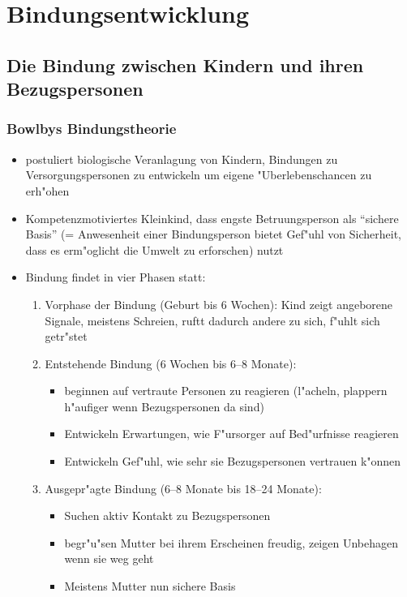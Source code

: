 \section{Bindungsentwicklung}
\subsection{Die Bindung zwischen Kindern und ihren Bezugspersonen}
\subsubsection{Bowlbys Bindungstheorie}
\begin{itemize}
	\item
		postuliert biologische Veranlagung von Kindern, Bindungen zu Versorgungspersonen zu entwickeln um eigene "Uberlebenschancen zu erh"ohen
	\item
		Kompetenzmotiviertes Kleinkind, dass engste Betruungsperson als \enquote{sichere Basis} (= Anwesenheit einer Bindungsperson bietet Gef"uhl von Sicherheit, dass es erm"oglicht die Umwelt zu erforschen) nutzt
	\item
		Bindung findet in vier Phasen statt:
		\begin{enumerate}
			\item
				Vorphase der Bindung (Geburt bis 6 Wochen): Kind zeigt angeborene Signale, meistens Schreien, ruftt dadurch andere zu sich, f"uhlt sich getr"stet
			\item
				Entstehende Bindung (6 Wochen bis 6--8 Monate): 
				\begin{itemize}
					\item
						beginnen auf vertraute Personen zu reagieren (l"acheln, plappern h"aufiger wenn Bezugspersonen da sind)
					\item
						Entwickeln Erwartungen, wie F"ursorger auf Bed"urfnisse reagieren
					\item
						Entwickeln Gef"uhl, wie sehr sie Bezugspersonen vertrauen k"onnen
				\end{itemize}
			\item
				Ausgepr"agte Bindung (6--8 Monate bis 18--24 Monate):
				\begin{itemize}
					\item
						Suchen aktiv Kontakt zu Bezugspersonen
					\item
						begr"u"sen Mutter bei ihrem Erscheinen freudig, zeigen Unbehagen wenn sie weg geht
					\item
						Meistens Mutter nun sichere Basis
				\end{itemize}

\end{enumerate}
\end{itemize}
